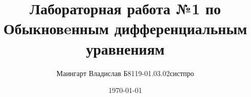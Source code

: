 \author{Маингарт Владислав Б8119-01.03.02систпро}
\title{Лабораторная работа №1 по Обыкновeнным дифференциальным уравнениям}
\date{\today}

\thispagestyle{empty}
\maketitle
